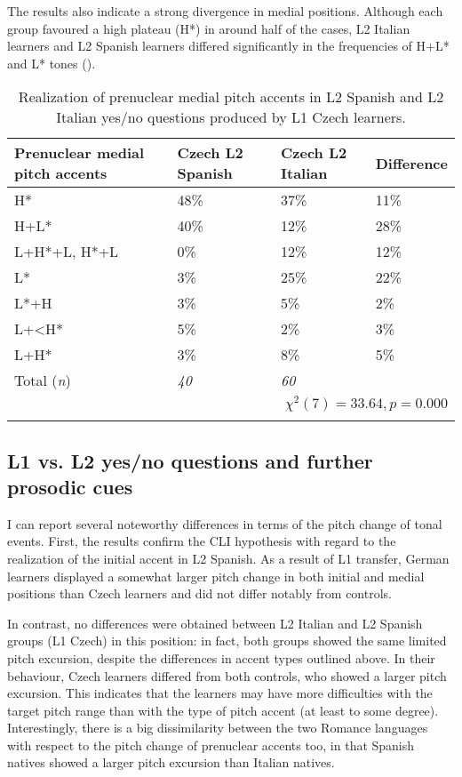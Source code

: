 The results also indicate a strong divergence in medial positions. Although each group favoured a high plateau (H*) in around half of the cases, L2 Italian learners and L2 Spanish learners differed significantly in the frequencies of H+L* and L* tones ().

\begin{table}[p]
\begin{tabularx}{\textwidth}{lYYY}

\lsptoprule

{Prenuclear medial pitch accents} & {Czech L2 Spanish} & {Czech L2 Italian} & {Difference}\\
\midrule
H* &  48\% &  37\% &  11\%\\
H+L* &  40\% &  12\% &  28\%\\
L+H*+L, H*+L &  0\% & 12\% &  12\%\\
L* &  3\% &  25\% &  22\%\\
L*+H &  3\% &  5\% &  2\%\\
L+<H* &  5\% &  2\% &  3\%\\
L+H* &  3\% &  8\% &  5\%\\
\midrule
Total (\textit{n}) & {\itshape 40} & {\itshape 60} &  \\
\\
\lspbottomrule
\end{tabularx}

\caption{Realization of prenuclear medial pitch accents in L2 Spanish and L2 Italian yes/no questions produced by L1 Czech learners.}
\label{tab:4.25}
\end{table}

\subsection{L1 vs. L2 yes/no questions and further prosodic cues}\label{sec:4.3.4}

I can report several noteworthy differences in terms of the pitch change of tonal events. First, the results confirm the CLI hypothesis with regard to the realization of the initial accent in L2 Spanish. As a result of L1 transfer, German learners displayed a somewhat larger pitch change in both initial and medial positions than Czech learners and did not differ notably from controls.


In contrast, no differences were obtained between L2 Italian and L2 Spanish groups (L1 Czech) in this position: in fact, both groups showed the same limited pitch excursion, despite the differences in accent types outlined above. In their behaviour, Czech learners differed from both controls, who showed a larger pitch excursion. This indicates that the learners may have more difficulties with the target pitch range than with the type of pitch accent (at least to some degree). Interestingly, there is a big dissimilarity between the two Romance languages with respect to the pitch change of prenuclear accents too, in that Spanish natives showed a larger pitch excursion than Italian natives.



